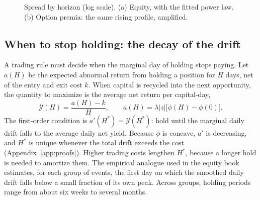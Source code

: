 \documentclass[11pt]{article}
\theoremstyle{definition}
\newcommand{\1}{\mathbf{1}}
\begin{document}
\begin{figure}[t]\centering
{}
\caption{Spread by horizon (log scale). (a) Equity, with the fitted power law. (b) Option
premia: the same rising profile, amplified.}\label{fig:spreads}
\end{figure}

\subsection{When to stop holding: the decay of the drift}

A trading rule must decide when the marginal day of holding stops paying. Let $a(H)$ be the
expected abnormal return from holding a position for $H$ days, net of the entry and exit
cost $k$. When capital is recycled into the next opportunity, the quantity to maximize is the
average net return per capital-day,
\begin{equation}
  \mathcal Y(H)=\frac{a(H)-k}{H},\qquad a(H)=\lambda|z|\big[\phi(H)-\phi(0)\big].
  \label{eq:holding}
\end{equation}
The first-order condition is $a'(H^\ast)=\mathcal Y(H^\ast)$: hold until the marginal daily drift
falls to the average daily net yield. Because $\phi$ is concave, $a'$ is decreasing, and
$H^\ast$ is unique whenever the total drift exceeds the cost (Appendix~\ref{app:proofs}).
Higher trading costs lengthen $H^\ast$, because a longer hold is needed to amortize them.
The empirical analogue used in the equity book estimates, for each group of events, the
first day on which the smoothed daily drift falls below a small fraction of its own peak.
Across groups, holding periods range from about six weeks to several months.
\end{document}
